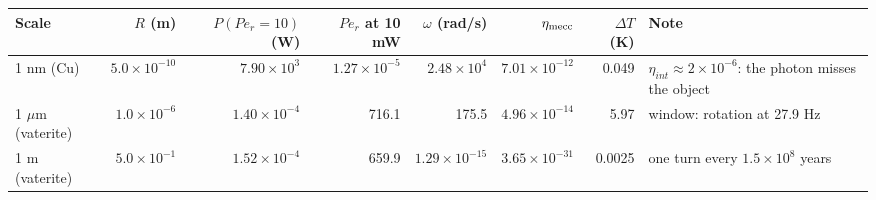 \begin{tabular}{@{}lrrrrrrp{2.8cm}@{}}
\hline
Scale & $R$ (m) & $P(Pe_r=10)$ (W) & $Pe_r$ at 10 mW & $\omega$ (rad/s) & $\eta_{\rm mecc}$ & $\Delta T$ (K) & Note \\
\hline
1 nm (Cu) & $5.0\times10^{-10}$ & $7.90\times10^{3}$ & $1.27\times10^{-5}$ & $2.48\times10^{4}$ & $7.01\times10^{-12}$ & 0.049 & $\eta_{int}\approx2\times10^{-6}$: the photon misses the object \\
1 $\mu$m (vaterite) & $1.0\times10^{-6}$ & $1.40\times10^{-4}$ & 716.1 & 175.5 & $4.96\times10^{-14}$ & 5.97 & window: rotation at 27.9 Hz \\
1 m (vaterite) & $5.0\times10^{-1}$ & $1.52\times10^{-4}$ & 659.9 & $1.29\times10^{-15}$ & $3.65\times10^{-31}$ & 0.0025 & one turn every $1.5\times10^{8}$ years \\
\hline
\end{tabular}
